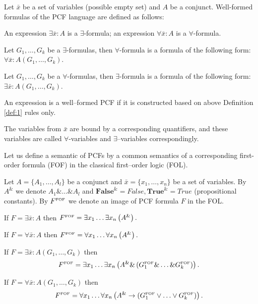 \documentclass[runningheads,a4paper]{llncs}
\begin{document}
\begin{definition}\label{def:1}
Let $\bar{x}$ be a set of variables (possible empty set) and $A$ be a conjunct. Well-formed formulas of the PCF language are defined as follows:

An expression $\exists \bar{x}\colon A$ is a $\exists$-formula; an expression $\forall \bar{x}\colon A$ is a $\forall$-formula.

Let $G_1,\ldots,G_k$ be a $\exists$-formulas, then $\forall$-formula is a formula of the following form: $\forall \bar{x}\colon A\left(G_1,\ldots,G_k\right)$.

Let $G_1,\ldots,G_k$ be a $\forall$-formulas, then $\exists$-formula is a formula of the following form: $\exists \bar{x}\colon A\left(G_1,\ldots,G_k\right)$.

\end{definition}


An expression is a well--formed PCF if it is constructed based on above Definition \ref{def:1} rules only.

The variables from $\bar{x}$ are bound by a corresponding quantifiers, and these variables are called $\forall$-variables and $\exists$--variables correspondingly.


Let us define a semantic of PCFs by a common semantics of a corresponding first-order formula (FOF) in the classical first--order logic (FOL).

\begin{definition}\label{def:semantic}
Let $A = \{A_1,\ldots,A_l\}$ be a conjunct and $\bar{x} = \{x_1,\ldots,x_n\}$ be a set of variables. By $A^{\&}$ we denote $A_1 \&\ldots\&A_l$ and $\boldsymbol{False}^{\&}= False, \boldsymbol{True}^{\&}=True$ (propositional constants). By $F^{\text{\tiny{FOF}}}$ we denote an image of PCF formula $F$ in the FOL.

If $F= \exists \bar{x}\colon A$ then $F^{\text{\tiny{FOF}}} = \exists x_1 \ldots \exists x_n \left(A^{\&}\right).$

If $F = \forall \bar{x}\colon A$ then $F^{\text{\tiny{FOF}}} = \forall x_1 \ldots \forall x_n \left(A^{\&}\right).$

If $F = \exists \bar{x}\colon A\left(G_1,\ldots,G_k\right)$ then $$F^{\text{\tiny{FOF}}} = \exists x_1 \ldots \exists x_n  \left(A^{\&} \& \left(G_{1}^{\text{\tiny{FOF}}} \& \ldots \& G_{k}^{\text{\tiny{FOF}}}\right)\right).$$

If $F = \forall \bar{x}\colon A\left(G_1,\ldots,G_k\right)$ then $$F^{\text{\tiny{FOF}}} = \forall x_1 \ldots \forall x_n \left(A^{\&}\rightarrow \left(G_{1}^{\text{\tiny{FOF}}} \vee\ldots\vee G_{k}^{\text{\tiny{FOF}}}\right)\right).$$

\end{definition}
\end{document}
